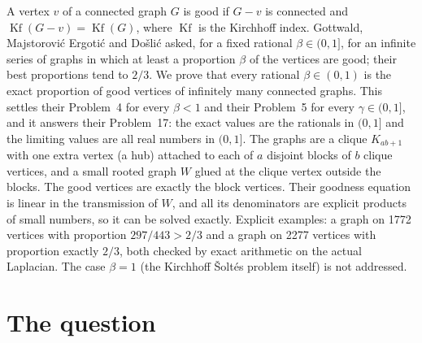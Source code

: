 \documentclass[11pt,a4paper]{report}
\newcommand*{\Kf}{\operatorname{Kf}}
\begin{document}
\makepapertitle

\begin{paperabstract}
A vertex \(v\) of a connected graph \(G\) is good if \(G-v\) is connected and \(\Kf(G-v)=\Kf(G)\), where \(\Kf\) is the
Kirchhoff index. Gottwald, Majstorović Ergotić and Došlić asked, for a fixed rational \(\beta\in(0,1]\), for an infinite
series of graphs in which at least a proportion \(\beta\) of the vertices are good; their best proportions tend to
\(2/3\). We prove that every rational \(\beta\in(0,1)\) is the exact proportion of good vertices of infinitely many
connected graphs. This settles their Problem~4 for every \(\beta<1\) and their Problem~5 for every \(\gamma\in(0,1]\), and
it answers their Problem~17: the exact values are the rationals in \((0,1]\) and the limiting values are all real numbers
in \((0,1]\). The graphs are a clique \(K_{ab+1}\) with one extra vertex (a hub) attached to each of \(a\) disjoint blocks
of \(b\) clique vertices, and a small rooted graph \(W\) glued at the clique vertex outside the blocks. The good vertices
are exactly the block vertices. Their goodness equation is linear in the transmission of \(W\), and all its denominators
are explicit products of small numbers, so it can be solved exactly. Explicit examples: a graph on 1772
vertices with proportion \(297/443>2/3\) and a graph on 2277 vertices with proportion exactly \(2/3\), both checked by exact
arithmetic on the actual Laplacian. The case \(\beta=1\) (the Kirchhoff Šoltés problem itself) is not addressed.
\end{paperabstract}

\section*{The question}
\end{document}
